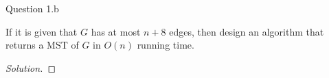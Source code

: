 \begin{solution}{Question 1.b}
    \begin{question}[]
        If it is given that $G$ has at most $n+8$ edges, then design an algorithm that returns a MST of $G$ in $O(n)$ running time.
    \end{question}
    \tcblower{}
    \begin{proof}[Solution]

    \end{proof}
\end{solution}
